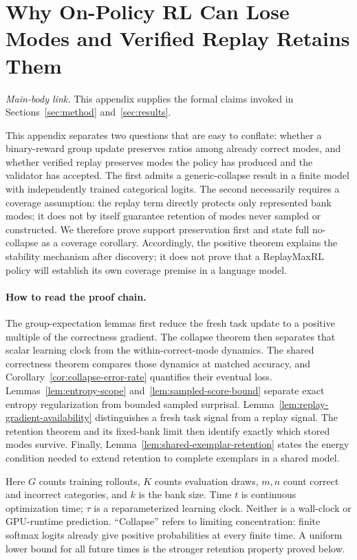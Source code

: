 \section{Why On-Policy RL Can Lose Modes and Verified Replay Retains Them}
\label{app:theory}

\noindent\emph{Main-body link.} This appendix supplies the formal claims
invoked in Sections~\ref{sec:method} and~\ref{sec:results}.

This appendix separates two questions that are easy to conflate: whether a
binary-reward group update preserves ratios among already correct modes, and
whether verified replay preserves modes the policy has produced
and the validator has accepted. The first admits a generic-collapse result in a
finite model with independently trained categorical logits. The second necessarily requires a coverage
assumption: the replay term directly protects only represented bank modes;
it does not by itself guarantee retention of modes never sampled or constructed. We therefore
prove support preservation first and state full no-collapse as a coverage
corollary. Accordingly, the positive theorem explains the stability mechanism
after discovery; it does not prove that a ReplayMaxRL policy will establish its own
coverage premise in a language model.

\paragraph{How to read the proof chain.}
The group-expectation lemmas first reduce the fresh task update to a positive
multiple of the correctness gradient. The collapse theorem then separates
that scalar learning clock from the within-correct-mode dynamics. The shared
correctness theorem compares those dynamics at matched accuracy, and
Corollary~\ref{cor:collapse-error-rate} quantifies their eventual loss.
Lemmas~\ref{lem:entropy-scope} and~\ref{lem:sampled-score-bound} separate
exact entropy regularization from bounded sampled surprisal.
Lemma~\ref{lem:replay-gradient-availability} distinguishes a fresh task signal
from a replay signal. The retention theorem and its fixed-bank limit then
identify exactly which stored modes survive. Finally,
Lemma~\ref{lem:shared-exemplar-retention} states the energy condition needed
to extend retention to complete exemplars in a shared model.

Here $G$ counts training rollouts, $K$ counts evaluation draws, $m,n$ count
correct and incorrect categories, and $k$ is the bank size. Time $t$ is
continuous optimization time; $\tau$ is a reparameterized learning clock.
Neither is a wall-clock or GPU-runtime prediction. ``Collapse'' refers to
limiting concentration: finite softmax logits already give positive
probabilities at every finite time. A uniform lower bound for all future
times is the stronger retention property proved below.

